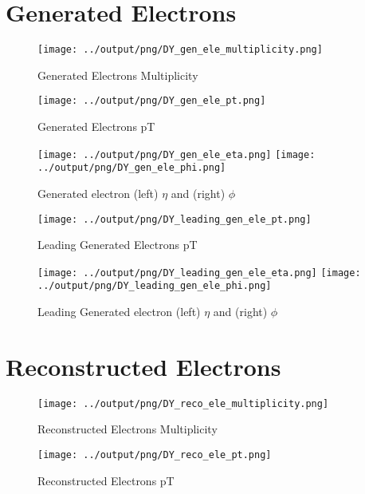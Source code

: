 \documentclass[11pt]{book}
\begin{document}
\section{Generated Electrons}

\begin{figure}[ht]
\centering
\texttt{[image: ../output/png/DY\_gen\_ele\_multiplicity.png]}
\caption{Generated Electrons Multiplicity}
\label{fig:dy_gen_ele_multiplicity}
\end{figure}

\begin{figure}[ht]
\centering
\texttt{[image: ../output/png/DY\_gen\_ele\_pt.png]}
\caption{Generated Electrons pT}
\label{fig:dy_gen_ele_pt}
\end{figure}

\begin{figure}[ht]
\centering
\texttt{[image: ../output/png/DY\_gen\_ele\_eta.png]}
\texttt{[image: ../output/png/DY\_gen\_ele\_phi.png]}
\caption{Generated electron (left) $\eta$ and (right) $\phi$}
\label{fig:dy_gen_ele_eta_phi}
\end{figure}


\begin{figure}[ht]
\centering
\texttt{[image: ../output/png/DY\_leading\_gen\_ele\_pt.png]}
\caption{Leading Generated Electrons pT}
\label{fig:dy_leading_gen_ele_pt}
\end{figure}

\begin{figure}[ht]
\centering
\texttt{[image: ../output/png/DY\_leading\_gen\_ele\_eta.png]}
\texttt{[image: ../output/png/DY\_leading\_gen\_ele\_phi.png]}
\caption{Leading Generated electron (left) $\eta$ and (right) $\phi$}
\label{fig:dy_leading_gen_ele_eta_phi}
\end{figure}
\clearpage

\section{Reconstructed Electrons}

\begin{figure}[ht]
\centering
\texttt{[image: ../output/png/DY\_reco\_ele\_multiplicity.png]}
\caption{Reconstructed Electrons Multiplicity}
\label{fig:dy_reco_ele_multiplicity}
\end{figure}

\begin{figure}[ht]
\centering
\texttt{[image: ../output/png/DY\_reco\_ele\_pt.png]}
\caption{Reconstructed Electrons pT}
\label{fig:dy_reco_ele_pt}
\end{figure}
\end{document}
